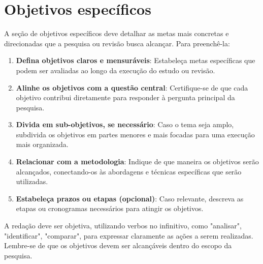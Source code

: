 \newpage
\section{Objetivos específicos}
\label{sc:objetivos}


A seção de objetivos específicos deve detalhar as metas mais concretas e direcionadas que a pesquisa ou revisão busca alcançar. Para preenchê-la:

\begin{enumerate}
    \item \textbf{Defina objetivos claros e mensuráveis}: Estabeleça metas específicas que podem ser avaliadas ao longo da execução do estudo ou revisão.
    \item \textbf{Alinhe os objetivos com a questão central}: Certifique-se de que cada objetivo contribui diretamente para responder à pergunta principal da pesquisa.
    \item \textbf{Divida em sub-objetivos, se necessário}: Caso o tema seja amplo, subdivida os objetivos em partes menores e mais focadas para uma execução mais organizada.
    \item \textbf{Relacionar com a metodologia}: Indique de que maneira os objetivos serão alcançados, conectando-os às abordagens e técnicas específicas que serão utilizadas.
    \item \textbf{Estabeleça prazos ou etapas (opcional)}: Caso relevante, descreva as etapas ou cronogramas necessários para atingir os objetivos.
\end{enumerate}

A redação deve ser objetiva, utilizando verbos no infinitivo, como "analisar", "identificar", "comparar", para expressar claramente as ações a serem realizadas. Lembre-se de que os objetivos devem ser alcançáveis dentro do escopo da pesquisa.
